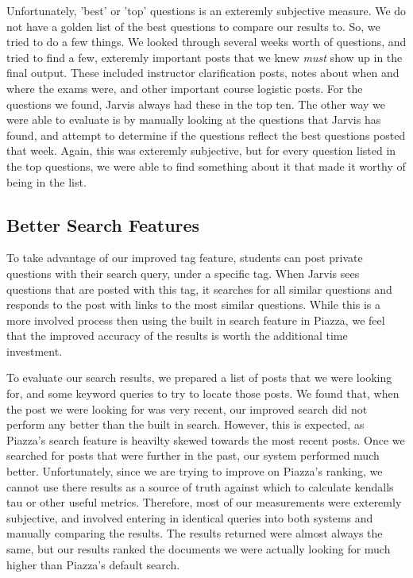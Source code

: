 \documentclass[sigconf]{acmart}
\begin{document}
Unfortunately, 'best' or 'top' questions is an exteremly subjective measure. We do not have a golden list of the best questions to compare our results to. So, we tried to do a few things. We looked through several weeks worth of questions, and tried to find a few, exteremly important posts that we knew \textit{must} show up in the final output. These included instructor clarification posts, notes about when and where the exams were, and other important course logistic posts. For the questions we found, Jarvis always had these in the top ten. The other way we were able to evaluate is by manually looking at the questions that Jarvis has found, and attempt to determine if the questions reflect the best questions posted that week. Again, this was exteremly subjective, but for every question listed in the top questions, we were able to find something about it that made it worthy of being in the list.

\subsection{Better Search Features}
To take advantage of our improved tag feature, students can post private questions with their search query, under a specific tag. When Jarvis sees questions that are posted with this tag, it searches for all similar questions and responds to the post with links to the most similar questions. While this is a more involved process then using the built in search feature in Piazza, we feel that the improved accuracy of the results is worth the additional time investment.

To evaluate our search results, we prepared a list of posts that we were looking for, and some keyword queries to try to locate those posts. We found that, when the post we were looking for was very recent, our improved search did not perform any better than the built in search. However, this is expected, as Piazza's search feature is heavilty skewed towards the most recent posts. Once we searched for posts that were further in the past, our system performed much better. Unfortunately, since we are trying to improve on Piazza's ranking, we cannot use there results as a source of truth against which to calculate kendalls tau or other useful metrics. Therefore, most of our measurements were exteremly subjective, and involved entering in identical queries into both systems and manually comparing the results. The results returned were almost always the same, but our results ranked the documents we were actually looking for much higher than Piazza's default search.
\end{document}
